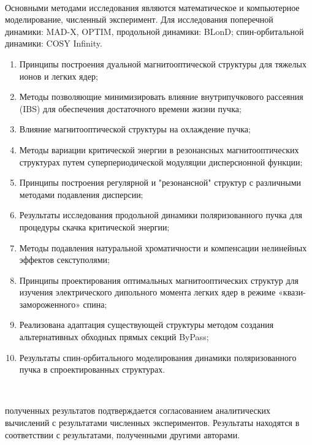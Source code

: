 ~\\
\par {\methods} Основными методами исследования являются математическое и компьютерное моделирование, численный эксперимент. Для исследования поперечной динамики: MAD-X, OPTIM, продольной динамики: BLonD; спин-орбитальной динамики: COSY Infinity.
~\\
\par {}
\begin{enumerate}[beginpenalty=10000] %
  \item Принципы построения дуальной магнитооптической структуры для тяжелых ионов и легких ядер;
  \item	Методы позволяющие минимизировать влияние внутрипучкового рассеяния (IBS) для обеспечения достаточного времени жизни пучка;
  \item	Влияние магнитооптической структуры на охлаждение пучка;
  \item	Методы вариации критической энергии в резонансных магнитооптических структурах путем суперпериодической модуляции дисперсионной функции;
  \item	Принципы построения регулярной и "резонансной" структур с различными методами подавления дисперсии;
  \item	Результаты исследования продольной динамики поляризованного пучка для процедуры скачка критической энергии;
  \item	Методы подавления натуральной хроматичности и компенсации нелинейных эффектов секступолями;
  \item Принципы проектирования оптимальных магнитооптических структур для изучения электрического дипольного момента легких ядер в режиме «квази-замороженного» спина;
  \item	Реализована адаптация существующей структуры методом создания альтернативных обходных прямых секций ByPass;
  \item	Результаты спин-орбитального моделирования динамики поляризованного пучка в спроектированных структурах.
\end{enumerate}
~\\
\par {\reliability} полученных результатов подтверждается согласованием аналитических вычислений с результатами численных экспериментов. Результаты находятся в соответствии с результатами, полученными другими авторами.
